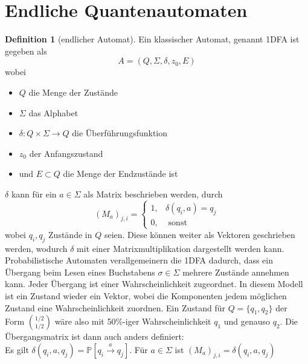 \documentclass[a4paper, 12pt]{article}
\theoremstyle{plain}
\theoremstyle{definition}
\newtheorem{definition}[theorem]{Definition} %
\theoremstyle{lemma}
\theoremstyle{remark}
\theoremstyle{example}
\begin{document}
	\section{Endliche Quantenautomaten}
	\begin{definition}[endlicher Automat]
		Ein klassischer Automat, genannt 1DFA ist gegeben als \[A = (Q, \Sigma, \delta, z_0, E)\] wobei \begin{itemize}
			\item $Q$ die Menge der Zustände
			\item $\Sigma$ das Alphabet
			\item $\delta : Q\times \Sigma \to Q$ die Überführungsfunktion
			\item $z_0$ der Anfangszustand
			\item und $E\subset Q$ die Menge der Endzustände ist
		\end{itemize}
		$\delta$ kann für ein $a \in \Sigma$ als Matrix beschrieben werden, durch \[(M_a)_{j,i} = \begin{cases}
			1, & \delta(q_i, a) = q_j\\
			0, & \text{ sonst}
		\end{cases}\]
		wobei $q_i, q_j$ Zustände in $Q$ seien. Diese können weiter als Vektoren geschrieben werden, wodurch $\delta$ mit einer Matrixmultiplikation dargestellt werden kann.\\
		Probabilistische Automaten verallgemeinern die 1DFA dadurch, dass ein Übergang beim Lesen eines Buchstabens $\sigma \in \Sigma$ mehrere Zustände annehmen kann. Jeder Übergang ist einer Wahrscheinlichkeit zugeordnet. In diesem Modell ist ein Zustand wieder ein Vektor, wobei die Komponenten jedem möglichen Zustand eine Wahrscheinlichkeit zuordnen. Ein Zustand für $Q = \{q_1,q_2\}$ der Form $\binom{1/2}{1/2}$ wäre also mit 50\%-iger Wahrscheinlichkeit $q_1$ und genauso $q_2$. Die Übergangsmatrix ist dann auch anders definiert:\\
		Es gilt $\delta(q_i,a,q_j) = \mathbb{P}[q_i \overset{a}{\to} q_j]$. Für $a \in \Sigma$ ist $(M_a)_{j,i} = \delta(q_i,a,q_j)$
	\end{definition}
\end{document}
